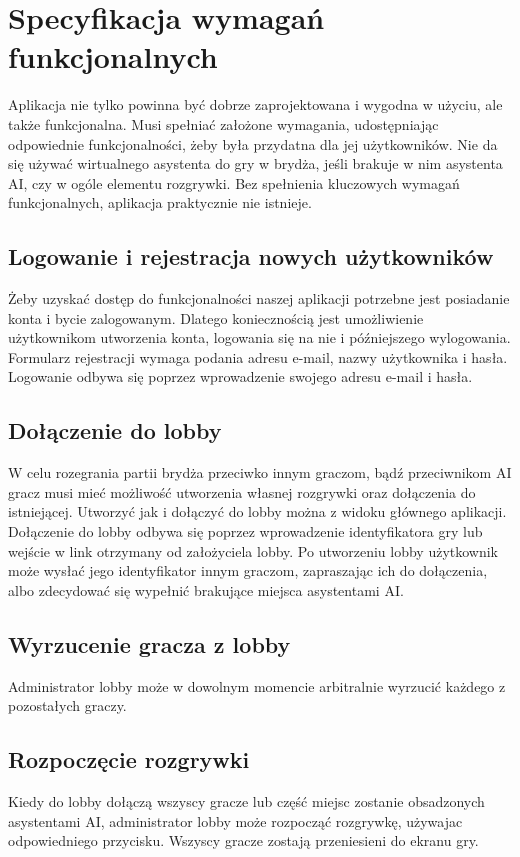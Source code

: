 


\section{Specyfikacja wymagań funkcjonalnych}
Aplikacja nie tylko powinna być dobrze zaprojektowana i wygodna w użyciu, ale także funkcjonalna. Musi spełniać założone wymagania, udostępniając odpowiednie funkcjonalności, żeby była przydatna dla jej użytkowników. Nie da się używać wirtualnego asystenta do gry w brydża, jeśli brakuje w nim asystenta AI, czy w ogóle elementu rozgrywki. Bez spełnienia kluczowych wymagań funkcjonalnych, aplikacja praktycznie nie istnieje.
\subsection{Logowanie i rejestracja nowych użytkowników}
Żeby uzyskać dostęp do funkcjonalności naszej aplikacji potrzebne jest posiadanie konta i bycie zalogowanym. Dlatego koniecznością jest umożliwienie użytkownikom utworzenia konta, logowania się na nie i późniejszego wylogowania. Formularz rejestracji wymaga podania adresu e-mail, nazwy użytkownika i hasła. Logowanie odbywa się poprzez wprowadzenie swojego adresu e-mail i hasła.
\subsection{Dołączenie do lobby}
W celu rozegrania partii brydża przeciwko innym graczom, bądź przeciwnikom AI gracz musi mieć możliwość utworzenia własnej rozgrywki oraz dołączenia do istniejącej. Utworzyć jak i dołączyć do lobby można z widoku głównego aplikacji.  Dołączenie do lobby odbywa się poprzez wprowadzenie identyfikatora gry lub wejście w link otrzymany od założyciela lobby. Po utworzeniu lobby użytkownik może wysłać jego identyfikator innym graczom, zapraszając ich do dołączenia, albo zdecydować się wypełnić brakujące miejsca asystentami AI. 
\subsection{Wyrzucenie gracza z lobby}
Administrator lobby może w dowolnym momencie arbitralnie wyrzucić każdego z pozostałych graczy.
\subsection{Rozpoczęcie rozgrywki}
Kiedy do lobby dołączą wszyscy gracze lub część miejsc zostanie obsadzonych asystentami AI, administrator lobby może rozpocząć rozgrywkę, używajac odpowiedniego przycisku. Wszyscy gracze zostają przeniesieni do ekranu gry. 
